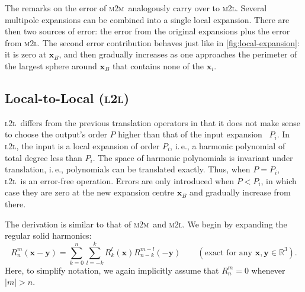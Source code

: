 \documentclass{scrbook}
\newcommand{\MtoM}{\textsc{m2m}}
\newcommand{\MtoL}{\textsc{m2l}}
\newcommand{\LtoL}{\textsc{l2l}}
\newcommand{\reals}{\ensuremath{\mathbb{R}}}
\newcommand{\wholespace}{\ensuremath{\reals^3}}
\newcommand{\vv}[1]{\ensuremath{\symbf{#1}}} %
\begin{document}
The remarks on the error of \MtoM\ analogously carry over to \MtoL. Several
multipole expansions can be combined into a single local expansion. There
are then two sources of error: the error from the original expansions plus
the error from \MtoL. The second error contribution behaves just like in
\cref{fig:local-expansion}: it is zero at $\vv{x}_B$, and then gradually
increases as one approaches the perimeter of the largest sphere around
$\vv{x}_B$ that contains none of the $\vv{x}_i$.

\subsection{Local-to-Local (\LtoL)}
\LtoL\ differs from the previous translation operators in that it does not make
sense to choose the output's order $P$ higher than that of the input expansion~%
$P_i$. In \LtoL, the input is a local expansion of order $P_i$, i.\,e., a
harmonic polynomial of total degree less than $P_i$. The space of harmonic
polynomials is invariant under translation, i.\,e., polynomials can be
translated exactly. Thus, when $P=P_i$, \LtoL\ is an error-free operation.
Errors are only introduced when $P<P_i$, in which case they are zero at the new
expansion centre $\vv{x}_B$ and gradually increase from there.

The derivation is similar to that of \MtoM\ and \MtoL. We begin by expanding
the regular solid harmonics:\autocite[Equation~(48)]{dehnen2014}
\begin{equation}\label{eqn:Rexpansion}
R_n^m(\vv{x}-\vv{y}) =
\sum_{k=0}^n\sum_{l=-k}^k R_{k}^{l}(\vv{x})R_{n-k}^{m-l}(-\vv{y})
\qquad
(\text{exact for any $\vv{x},\vv{y}\in\wholespace$}).
\end{equation}
Here, to simplify notation, we again implicitly assume that $R_n^m=0$ whenever
$|m| > n$.
\end{document}
